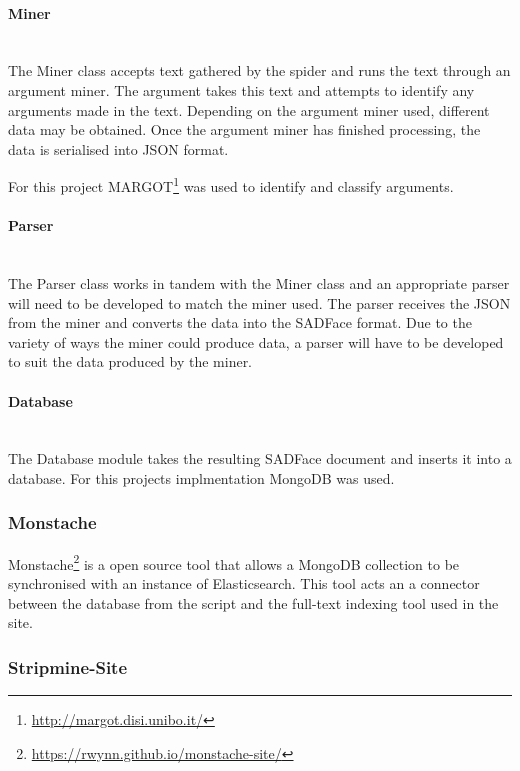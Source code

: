 \documentclass[12pt,a4paper]{article}
\begin{document}
\paragraph{Miner}\mbox{}\\

The Miner class accepts text gathered by the spider and runs the text through an argument miner. The argument takes this text and attempts to identify any arguments made in the text. Depending on the argument miner used, different data may be obtained. Once the argument miner has finished processing, the data is serialised into JSON format.

For this project MARGOT\footnote{\url{http://margot.disi.unibo.it/}} was used to identify and classify arguments.

\paragraph{Parser}\mbox{}\\

The Parser class works in tandem with the Miner class and an appropriate parser will need to be developed to match the miner used. The parser receives the JSON from the miner and converts the data into the SADFace format. Due to the variety of ways the miner could produce data, a parser will have to be developed to suit the data produced by the miner.

\paragraph{Database}\mbox{}\\

The Database module takes the resulting SADFace document and inserts it into a database. For this projects implmentation MongoDB was used.

\subsubsection{Monstache}

Monstache\footnote{\url{https://rwynn.github.io/monstache-site/}} is a open source tool that allows a MongoDB collection to be synchronised with an instance of Elasticsearch. This tool acts an a connector between the database from the script and the full-text indexing tool used in the site. 

\subsubsection{Stripmine-Site}
\end{document}

